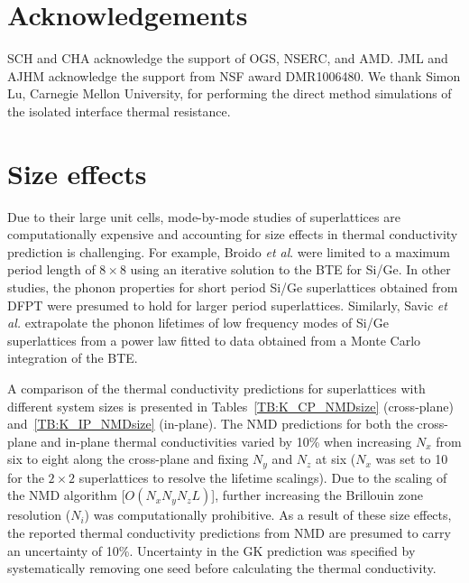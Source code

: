\documentclass[aps,prb,preprint,preprintnumbers,amsmath,amssymb,floatfix,superscriptaddress]{revtex4}
\begin{document}


\section{Acknowledgements}
SCH and CHA acknowledge the support of OGS, NSERC, and AMD. JML and AJHM acknowledge the support from NSF award DMR1006480. We thank Simon Lu, Carnegie Mellon University, for performing the direct method simulations of the isolated interface thermal resistance.

\newpage
\appendix
\section{Size effects}\label{app:size effects}
Due to their large unit cells, mode-by-mode studies of superlattices are computationally expensive and accounting for size effects in thermal conductivity prediction is challenging. For example, Broido \textit{et al}. were limited to a maximum period length of $8\times 8$ using an iterative solution to the BTE for Si/Ge.\cite {PhysRevB.70.081310} In other studies, the phonon properties for short period Si/Ge superlattices obtained from DFPT were presumed to hold for larger period superlattices.\cite{Luckyanova16112012, doi:10.1021/nl202186y} Similarly, Savic \textit{et al.} extrapolate the phonon lifetimes of low frequency modes of Si/Ge superlattices from a power law fitted to data obtained from a Monte Carlo integration of the BTE.\cite{savic:073113} 

A comparison of the thermal conductivity predictions for superlattices with different system sizes is presented in Tables~\ref{TB:K_CP_NMDsize} (cross-plane) and~\ref{TB:K_IP_NMDsize} (in-plane). The NMD predictions for both the cross-plane and in-plane thermal conductivities varied by 10\% when increasing $N_x$ from six to eight along the cross-plane and fixing $N_y$ and $N_z$ at six ($N_x$ was set to 10 for the $2\times2$ superlattices to resolve the lifetime scalings). %
Due to the scaling of the NMD algorithm [$O(N_xN_yN_z L)$], further increasing the Brillouin zone resolution ($N_i$) was computationally prohibitive. As a result of these size effects, the reported thermal conductivity predictions from NMD are presumed to carry an uncertainty of 10\%. Uncertainty in the GK prediction was specified by systematically removing one seed before calculating the thermal conductivity.
\end{document}
